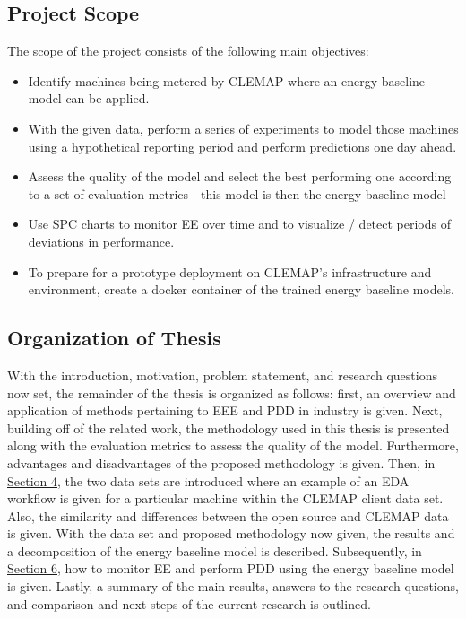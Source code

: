 \subsection{Project Scope}

The scope of the project consists of the following main objectives:

\begin{itemize}
    \item Identify machines being metered by CLEMAP where an energy baseline model can be applied.
    \item With the given data, perform a series of experiments to model those machines using a hypothetical reporting period and perform predictions one day ahead.
    \item Assess the quality of the model and select the best performing one according to a set of evaluation metrics—this model is then the energy baseline model
    \item Use \ac{SPC} charts to monitor EE over time and to visualize / detect periods of deviations in performance. 
    \item To prepare for a prototype deployment on CLEMAP's infrastructure and environment, create a docker container of the trained energy baseline models.
\end{itemize}

\subsection{Organization of Thesis}

With the introduction, motivation, problem statement, and research questions now set, the remainder of the thesis is organized as follows: first, an overview and application of methods pertaining to EEE and PDD in industry is given. Next, building off of the related work, the methodology used in this thesis is presented along with the evaluation metrics to assess the quality of the model. Furthermore, advantages and disadvantages of the proposed methodology is given. Then, in \hyperlink{section.4}{Section 4}, the two data sets are introduced where an example of an \ac{EDA} workflow is given for a particular machine within the CLEMAP client data set. Also, the similarity and differences between the open source and CLEMAP data is given. With the data set and proposed methodology now given, the results and a decomposition of the energy baseline model is described. Subsequently, in \hyperlink{section.6}{Section 6}, how to monitor EE and perform PDD using the energy baseline model is given. Lastly, a summary of the main results, answers to the research questions, and comparison and next steps of the current research is outlined.